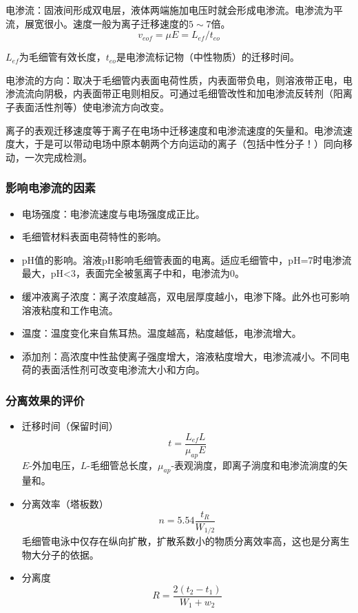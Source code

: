 电渗流：固液间形成双电层，液体两端施加电压时就会形成电渗流。电渗流为平流，展宽很小。速度一般为离子迁移速度的$5\sim 7$倍。
\begin{equation*}
	v_{eof}=\mu E=L_{ef}/t_{eo}
\end{equation*}

$L_{ef}$为毛细管有效长度，$t_{eo}$是电渗流标记物（中性物质）的迁移时间。

电渗流的方向：取决于毛细管内表面电荷性质，内表面带负电，则溶液带正电，电渗流流向阴极，内表面带正电则相反。可通过毛细管改性和加电渗流反转剂（阳离子表面活性剂等）使电渗流方向改变。

离子的表观迁移速度等于离子在电场中迁移速度和电渗流速度的矢量和。电渗流速度大，于是可以带动电场中原本朝两个方向运动的离子（包括中性分子！）同向移动，一次完成检测。

\subsubsection{影响电渗流的因素}
\begin{itemize}
	\item 电场强度：电渗流速度与电场强度成正比。
	\item 毛细管材料表面电荷特性的影响。
	\item pH值的影响。溶液pH影响毛细管表面的电离。适应毛细管中，pH=7时电渗流最大，pH<3，表面完全被氢离子中和，电渗流为0。
	\item 缓冲液离子浓度：离子浓度越高，双电层厚度越小，电渗下降。此外也可影响溶液粘度和工作电流。
	\item 温度：温度变化来自焦耳热。温度越高，粘度越低，电渗流增大。
	\item 添加剂：高浓度中性盐使离子强度增大，溶液粘度增大，电渗流减小。不同电荷的表面活性剂可改变电渗流大小和方向。
\end{itemize}

\subsubsection{分离效果的评价}
\begin{itemize}
	\item 迁移时间（保留时间）
	\[t=\dfrac{L_{ef}L}{\mu_{ap}E}\]
	$E$-外加电压，$L$-毛细管总长度，$\mu_{ap}$-表观淌度，即离子淌度和电渗流淌度的矢量和。
	\item 分离效率（塔板数）
	\[n=5.54\dfrac{t_R}{W_{1/2}}\]
	毛细管电泳中仅存在纵向扩散，扩散系数小的物质分离效率高，这也是分离生物大分子的依据。
	\item 分离度
	\[R=\dfrac{2(t_2-t_1)}{W_1+w_2}\]
\end{itemize}

